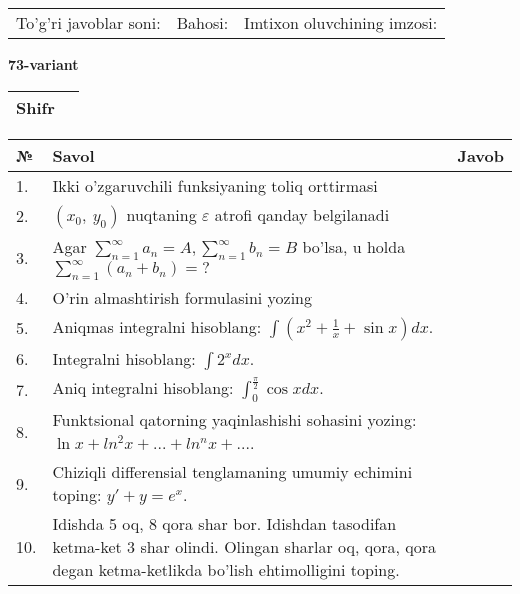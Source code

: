 \documentclass{article}
\begin{document}
  \vspace{1cm}
  
  \begin{tabular}{lll}
  To'g'ri javoblar soni: \underline{\hspace{1.5cm}} & 
  Bahosi: \underline{\hspace{1.5cm}} & 
  Imtixon oluvchining imzosi: \underline{\hspace{2cm}} \\
  \end{tabular}
  
  \egroup
  
  \newpage
  
  
  \textbf{73-variant}\\
  
  \bgroup
  \def\arraystretch{1.6} %
  
  \begin{tabular}{|m{5.7cm}|m{9.5cm}|}
  \hline
  Shifr & \\
  \hline
  \end{tabular}
  
  \vspace{1cm}
  
  \begin{tabular}{|m{0.7cm}|m{10cm}|m{4cm}|}
  \hline
  № & Savol & Javob \\
  \hline
  1. & Ikki o'zgaruvchili funksiyaning toliq orttirmasi &  \\
  \hline
  2. & \((x_{0},\ y_{0})\) nuqtaning \(\varepsilon\) atrofi qanday belgilanadi &  \\
  \hline
  3. & Agar \(\sum_{n = 1}^{\infty}a_{n} = A,\sum_{n = 1}^{\infty}b_{n} = B\) bo'lsa, u holda \(\sum_{n = 1}^{\infty}\left( a_{n} + b_{n} \right) = ?\) &  \\
  \hline
  4. & O'rin almashtirish formulasini yozing &  \\
  \hline
  5. & Aniqmas integralni hisoblang: \(\int {\left( x^{2} + \frac{1}{x} + \sin x \right)dx}\). &  \\
  \hline
  6. & Integralni hisoblang: \(\int {2^{x}dx}\). &  \\
  \hline
  7. & Aniq integralni hisoblang: \(\int_{0}^{\frac{\pi}{2}}{\cos xdx}\). &  \\
  \hline
  8. & Funktsional qatorning yaqinlashishi sohasini yozing: \(\ln x + ln^{2}x + ... + ln^{n}x + ...\). &  \\
  \hline
  9. & Chiziqli differensial tenglamaning umumiy echimini toping: \(y' + y = e^{x}\). &  \\
  \hline
  10. & Idishda 5 oq, 8 qora shar bor. Idishdan tasodifan ketma-ket 3 shar olindi. Olingan sharlar oq, qora, qora degan ketma-ketlikda bo'lish ehtimolligini toping. &  \\
  \hline
  \end{tabular}
  
\end{document}
